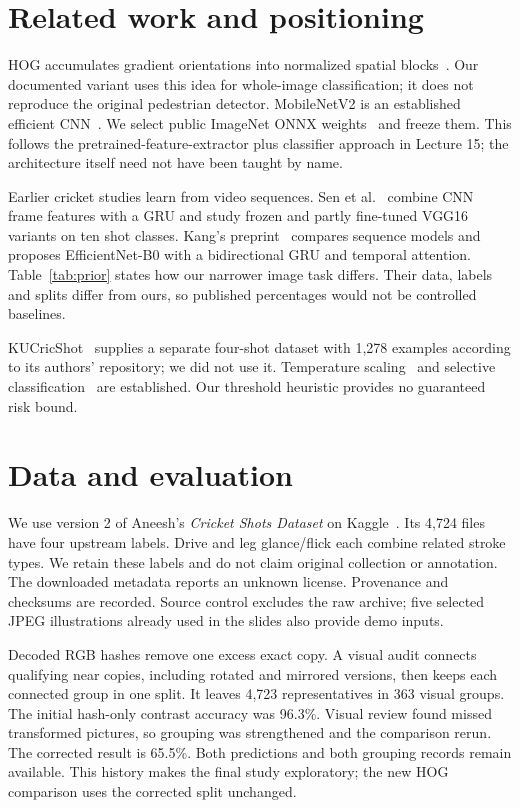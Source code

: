 \section{Related work and positioning}
HOG accumulates gradient orientations into normalized spatial blocks~\cite{dalal}. Our documented variant uses this idea for whole-image classification; it does not reproduce the original pedestrian detector. MobileNetV2 is an established efficient CNN~\cite{sandler}. We select public ImageNet ONNX weights~\cite{onnxmodel} and freeze them. This follows the pretrained-feature-extractor plus classifier approach in Lecture 15; the architecture itself need not have been taught by name.

Earlier cricket studies learn from video sequences. Sen et al.~\cite{sen} combine CNN frame features with a GRU and study frozen and partly fine-tuned VGG16 variants on ten shot classes. Kang's preprint~\cite{kang} compares sequence models and proposes EfficientNet-B0 with a bidirectional GRU and temporal attention. Table~\ref{tab:prior} states how our narrower image task differs. Their data, labels and splits differ from ours, so published percentages would not be controlled baselines.


KUCricShot~\cite{kucricshot} supplies a separate four-shot dataset with 1,278 examples according to its authors' repository; we did not use it. Temperature scaling~\cite{guo} and selective classification~\cite{geifman} are established. Our threshold heuristic provides no guaranteed risk bound.

\section{Data and evaluation}
We use version 2 of Aneesh's \emph{Cricket Shots Dataset} on Kaggle~\cite{imagedataset}. Its 4,724 files have four upstream labels. Drive and leg glance/flick each combine related stroke types. We retain these labels and do not claim original collection or annotation. The downloaded metadata reports an unknown license. Provenance and checksums are recorded. Source control excludes the raw archive; five selected JPEG illustrations already used in the slides also provide demo inputs.

Decoded RGB hashes remove one excess exact copy. A visual audit connects qualifying near copies, including rotated and mirrored versions, then keeps each connected group in one split. It leaves 4,723 representatives in 363 visual groups. The initial hash-only contrast accuracy was 96.3\%. Visual review found missed transformed pictures, so grouping was strengthened and the comparison rerun. The corrected result is 65.5\%. Both predictions and both grouping records remain available. This history makes the final study exploratory; the new HOG comparison uses the corrected split unchanged.

